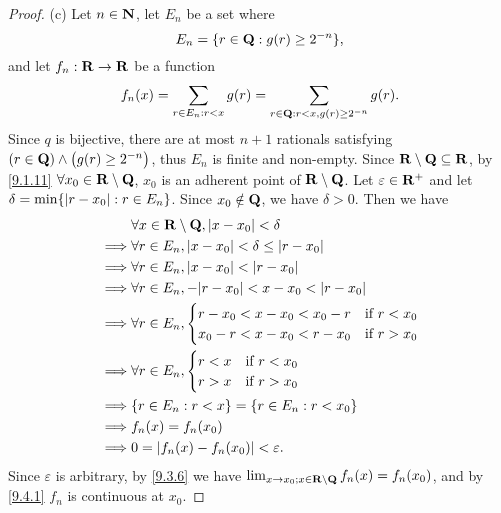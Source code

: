 \begin{proof}{(c)}
  Let \(n \in \mathbf{N}\), let \(E_n\) be a set where
  \[
    E_n = \{r \in \mathbf{Q} : g(r) \geq 2^{-n}\},
  \]
  and let \(f_n : \mathbf{R} \to \mathbf{R}\) be a function
  \[
    f_n(x) = \sum_{r \in E_n : r < x} g(r) = \sum_{r \in \mathbf{Q} : r < x, g(r) \geq 2^{-n}} g(r).
  \]
  Since \(q\) is bijective, there are at most \(n + 1\) rationals satisfying \((r \in \mathbf{Q}) \land \big(g(r) \geq 2^{-n}\big)\), thus \(E_n\) is finite and non-empty.
  Since \(\mathbf{R} \setminus \mathbf{Q} \subseteq \mathbf{R}\), by \cref{9.1.11} \(\forall x_0 \in \mathbf{R} \setminus \mathbf{Q}\), \(x_0\) is an adherent point of \(\mathbf{R} \setminus \mathbf{Q}\).
  Let \(\varepsilon \in \mathbf{R}^+\) and let \(\delta = \min\{\left\lvert r - x_0\right\rvert : r \in E_n\}\).
  Since \(x_0 \notin \mathbf{Q}\), we have \(\delta > 0\).
  Then we have
  \begin{align*}
             & \forall x \in \R \setminus \Q, \abs{x - x_0} < \delta               \\
    \implies & \forall r \in E_n, \abs{x - x_0} < \delta \leq \abs{r - x_0}        \\
    \implies & \forall r \in E_n, \abs{x - x_0} < \abs{r - x_0}                    \\
    \implies & \forall r \in E_n, -\abs{r - x_0} < x - x_0 < \abs{r - x_0}         \\
    \implies & \forall r \in E_n, \begin{cases}
                                    r - x_0 < x - x_0 < x_0 - r & \text{if } r < x_0 \\
                                    x_0 - r < x - x_0 < r - x_0 & \text{if } r > x_0
                                  \end{cases} \\
    \implies & \forall r \in E_n, \begin{cases}
                                    r < x & \text{if } r < x_0 \\
                                    r > x & \text{if } r > x_0
                                  \end{cases}                       \\
    \implies & \{r \in E_n : r < x\} = \{r \in E_n : r < x_0\}                     \\
    \implies & f_n(x) = f_n(x_0)                                                   \\
    \implies & 0 = \abs{f_n(x) - f_n(x_0)} < \varepsilon.
  \end{align*}
  Since \(\varepsilon\) is arbitrary, by \cref{9.3.6} we have \(\lim_{x \to x_0 ; x \in \mathbf{R} \setminus \mathbf{Q}} f_n(x) = f_n(x_0)\), and by \cref{9.4.1} \(f_n\) is continuous at \(x_0\).


\end{proof}
